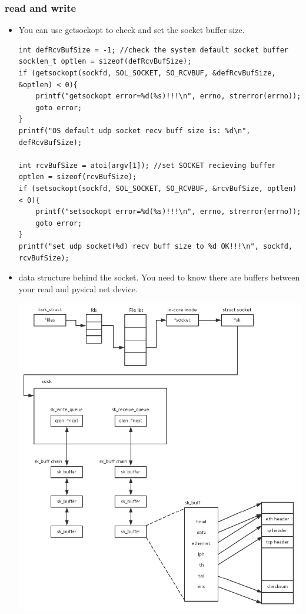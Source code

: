 \documentclass[a4paper,11pt,twoside]{book}
\begin{document}
\subsubsection{read and write}
\begin{itemize}
		\item You can use getsockopt to check and set the socket buffer size. 
\begin{lstlisting}
int defRcvBufSize = -1; //check the system default socket buffer
socklen_t optlen = sizeof(defRcvBufSize);
if (getsockopt(sockfd, SOL_SOCKET, SO_RCVBUF, &defRcvBufSize, &optlen) < 0){
	printf("getsockopt error=%d(%s)!!!\n", errno, strerror(errno));
	goto error;
}
printf("OS default udp socket recv buff size is: %d\n", defRcvBufSize);

int rcvBufSize = atoi(argv[1]); //set SOCKET recieving buffer
optlen = sizeof(rcvBufSize);
if (setsockopt(sockfd, SOL_SOCKET, SO_RCVBUF, &rcvBufSize, optlen) < 0){
	printf("setsockopt error=%d(%s)!!!\n", errno, strerror(errno));
	goto error;
}
printf("set udp socket(%d) recv buff size to %d OK!!!\n", sockfd, rcvBufSize);	
\end{lstlisting}		
	
	\item data structure behind the socket. You need to know there are buffers between your read and pysical net device. 
	\begin{center}
		\includegraphics[width=0.85\linewidth]{pics/socket_inside.png}
	\end{center}



\end{itemize}
\end{document}
